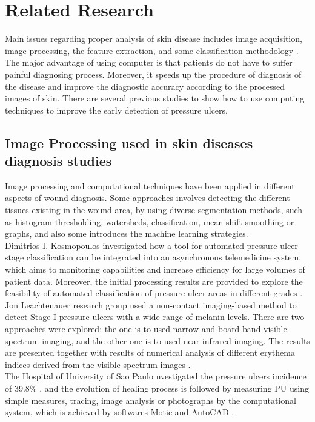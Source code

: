\section{Related Research}
Main issues regarding proper analysis of skin disease includes image acquisition, image processing, the feature extraction, and some classification methodology \cite{Patel}. The major advantage of using computer is that patients do not have to suffer painful diagnosing process. Moreover, it speeds up the procedure of diagnosis of the disease and improve the diagnostic accuracy according to the processed images of skin. There are several previous studies to show how to use computing  techniques to improve the early detection of pressure ulcers.\\

\subsection{Image Processing used in skin diseases diagnosis studies}
Image processing and computational techniques have been applied in different aspects of wound diagnosis. Some approaches involves detecting the different tissues existing in the wound area, by using diverse segmentation methods, such as histogram thresholding, watersheds, classification, mean-shift smoothing or graphs, and also some introduces the machine learning strategies. \\

Dimitrios I. Kosmopoulos investigated how a tool for automated pressure ulcer stage classification can be integrated into an asynchronous telemedicine system, which aims to monitoring capabilities and  increase efficiency for large volumes of patient
data. Moreover, the initial processing results are provided to
explore the feasibility of automated classification of pressure ulcer areas in different grades \cite{Kosmopoulos}.\\

Jon Leachtenauer research group used a non-contact imaging-based method to detect Stage I pressure ulcers with a wide range of melanin levels. There are two approaches were explored: the one is to used narrow and board band visible spectrum imaging, and the other one is to used near infrared imaging. The results are presented together with results of numerical analysis of different erythema indices derived from the visible spectrum images \cite{Leachtenauer}. \\

The Hospital of University of Sao Paulo nvestigated the pressure ulcers incidence of 39.8\% \cite{Rogenski}, and the evolution of healing process is followed by measuring PU using simple measures, tracing, image analysis or photographs by the computational system, which is achieved by softwares Motic and AutoCAD \cite{minister}.\\

